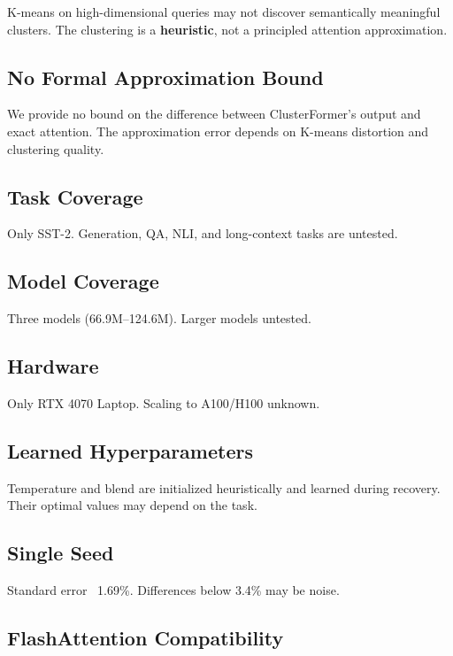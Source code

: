 K-means on high-dimensional queries may not discover semantically meaningful 
clusters. The clustering is a \textbf{heuristic}, not a principled attention 
approximation.

\subsection{No Formal Approximation Bound}

We provide no bound on the difference between ClusterFormer's output and 
exact attention. The approximation error depends on K-means distortion 
and clustering quality.

\subsection{Task Coverage}

Only SST-2. Generation, QA, NLI, and long-context tasks are untested.

\subsection{Model Coverage}

Three models (66.9M--124.6M). Larger models untested.

\subsection{Hardware}

Only RTX 4070 Laptop. Scaling to A100/H100 unknown.

\subsection{Learned Hyperparameters}

Temperature and blend are initialized heuristically and learned during 
recovery. Their optimal values may depend on the task.

\subsection{Single Seed}

Standard error ~1.69\%. Differences below 3.4\% may be noise.

\subsection{FlashAttention Compatibility}

